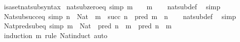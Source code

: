 \begin{isabellebody}
\isanewline
\isanewline
{}\isamarkupfalse%
\ isa{\isacharunderscore}{\kern0pt}set{\isacharunderscore}{\kern0pt}nat{\isacharunderscore}{\kern0pt}sub{\isacharunderscore}{\kern0pt}syntax\isanewline
\isanewline
{}\isamarkupfalse%
\ nat{\isacharunderscore}{\kern0pt}sub{\isacharunderscore}{\kern0pt}zero{\isacharunderscore}{\kern0pt}eq\ {\isacharbrackleft}{\kern0pt}simp{\isacharbrackright}{\kern0pt}{\isacharcolon}{\kern0pt}\ {\isachardoublequoteopen}m\ {\isacharminus}{\kern0pt}\ {}\ {\isacharequal}{\kern0pt}\ m{\isachardoublequoteclose}\isanewline
%
\isadelimproof
\ \ %
\endisadelimproof
%
\isatagproof
{}\isamarkupfalse%
\ nat{\isacharunderscore}{\kern0pt}sub{\isacharunderscore}{\kern0pt}def\ \isamarkupfalse%
\ simp%
\endisatagproof
{\isafoldproof}%
%
\isadelimproof
\isanewline
%
\endisadelimproof
\isanewline
{}\isamarkupfalse%
\ Nat{\isacharunderscore}{\kern0pt}sub{\isacharunderscore}{\kern0pt}succ{\isacharunderscore}{\kern0pt}eq\ {\isacharbrackleft}{\kern0pt}simp{\isacharbrackright}{\kern0pt}{\isacharcolon}{\kern0pt}\ {\isachardoublequoteopen}n\ {\isacharcolon}{\kern0pt}\ Nat\ {\isasymLongrightarrow}\ m\ {\isacharminus}{\kern0pt}\ succ\ n\ {\isacharequal}{\kern0pt}\ pred\ {\isacharparenleft}{\kern0pt}m\ {\isacharminus}{\kern0pt}\ n{\isacharparenright}{\kern0pt}{\isachardoublequoteclose}\isanewline
%
\isadelimproof
\ \ %
\endisadelimproof
%
\isatagproof
{}\isamarkupfalse%
\ nat{\isacharunderscore}{\kern0pt}sub{\isacharunderscore}{\kern0pt}def\ \isamarkupfalse%
\ simp%
\endisatagproof
{\isafoldproof}%
%
\isadelimproof
\isanewline
%
\endisadelimproof
\isanewline
{}\isamarkupfalse%
\ Nat{\isacharunderscore}{\kern0pt}pred{\isacharunderscore}{\kern0pt}sub{\isacharunderscore}{\kern0pt}eq\ {\isacharbrackleft}{\kern0pt}simp{\isacharbrackright}{\kern0pt}{\isacharcolon}{\kern0pt}\ {\isachardoublequoteopen}m\ {\isacharcolon}{\kern0pt}\ Nat\ {\isasymLongrightarrow}\ pred\ n\ {\isacharminus}{\kern0pt}\ m\ {\isacharequal}{\kern0pt}\ pred\ {\isacharparenleft}{\kern0pt}n\ {\isacharminus}{\kern0pt}\ m{\isacharparenright}{\kern0pt}{\isachardoublequoteclose}\isanewline
%
\isadelimproof
\ \ %
\endisadelimproof
%
\isatagproof
{}\isamarkupfalse%
\ {\isacharparenleft}{\kern0pt}induction\ m\ rule{\isacharcolon}{\kern0pt}\ Nat{\isacharunderscore}{\kern0pt}induct{\isacharparenright}{\kern0pt}\ auto%
\endisatagproof
{\isafoldproof}%
%
\isadelimproof
\isanewline
%
\endisadelimproof
\isanewline
{}\isamarkupfalse%

\end{isabellebody}
